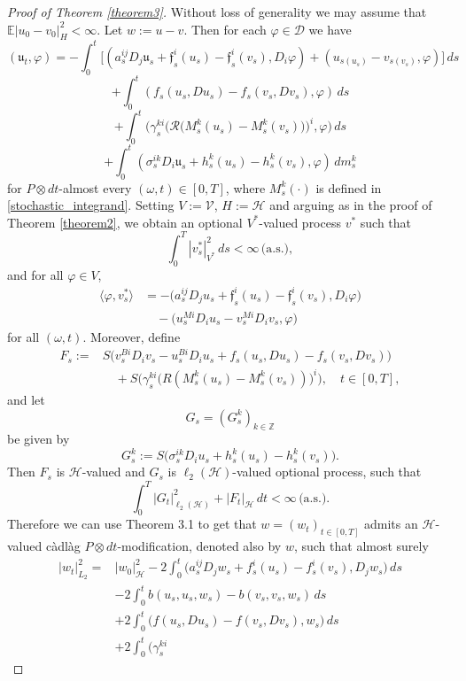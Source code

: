 \documentclass[11pt,reqno]{amsart}
\theoremstyle{definition}
\theoremstyle{remark}
\newcommand\bZ{\mathbb{Z}}
\newcommand\frf{\mathfrak{f}}
\newcommand\fru{\mathfrak{u}}
\newcommand\cD{\mathcal{D}}
\newcommand\cH{\mathcal{H}}
\newcommand\cR{\mathcal{R}}
\newcommand\cV{\mathcal{V}}
\newcommand{\<}{\langle}
\renewcommand{\>}{\rangle}
\newcommand{\E}{\mathbb{E}}
\begin{document}
\medskip
\begin{proof}[Proof of Theorem \ref{theorem3}]
Without loss of generality we may assume that 
$\E|u_0-v_0|_{H}^2<\infty$. Let $w:=u-v$. 
Then for each $\varphi\in \cD$ we have 
$$
(\fru_t,\varphi)
=-\int_0^t\big[(a^{ij}_sD_j\fru_s+\frf_s^{i}(u_s)-\frf^{i}_s(v_s),D_i\varphi)
+(u_{s(u_s)}-v_{s(v_s)}, \varphi)\big]\,ds
$$
$$
+\int_0^t
(f_s(u_s,Du_s)-f_s(v_s,Dv_s),\varphi)\,ds
$$
$$
+\int_0^t
\Big(\gamma_s^{ki}\big(\cR\big(M^k_s(u_s)-M^k_s(v_s)\big)\big)^i,\varphi\Big)
\,ds
$$
$$
+\int_0^t(\sigma_s^{ik}D_i\fru_s+h_s^k(u_s)-h_s^k(v_s),\varphi)\,dm^k_s
$$
for $P\otimes dt$-almost every $(\omega,t)\in [0,T]$, 
where $M_s^k(\cdot)$ is defined in \eqref{stochastic_integrand}. 
Setting $V:=\cV$, $H:=\cH$ and arguing 
as in the proof of Theorem \ref{theorem2}, 
we obtain an optional 
$V^*$-valued process $v^*$ such that
$$
\int_0^T |v_s^*|_{V^*}^2\,ds<\infty\,\text{(a.s.)}, 
$$
and for all $\varphi\in V$,
$$
\begin{aligned}
\langle \varphi,v_s^*\rangle
&=
-
\big(
a_s^{ij}D_j u_s
+
\frf_s^i(u_s)-\frf_s^i(v_s),
D_i\varphi
\big)
\\
&\quad
-
\big(
u_s^{Mi}D_i u_s-v_s^{Mi}D_i v_s,
\varphi
\big)
\end{aligned}
$$
for all $(\omega,t)$.
Moreover, define
$$
\begin{aligned}
F_s:={}&S\Big(v_s^{Bi}D_i v_s-u_s^{Bi}D_i u_s
+f_s(u_s,Du_s)-f_s(v_s,Dv_s)\Big)\\
&\quad
+
S\Big(\gamma_s^{ki}\big(R(M_s^k(u_s)-M_s^k(v_s))\big)^i\Big),
\quad t\in[0,T],
\end{aligned}
$$
and let 
$$
G_s=(G_s^k)_{k\in\bZ}
$$
be given by
$$
G_s^k
:=
S\big(
\sigma_s^{ik}D_i u_s
+
h_s^k(u_s)-h_s^k(v_s)
\big).
$$
Then $F_s$ is $\mathcal H$-valued and $G_s$ is
$\ell_2(\mathcal H)$-valued optional process, such that 
$$
\int_0^T|G_t|_{\ell_2(\mathcal H)}^2
+
|F_t|_{\mathcal H}\,dt<\infty\,\text{(a.s.).}
$$
Therefore we can use Theorem 3.1 to get that $w=(w_t)_{t\in[0,T]}$
admits an $\mathcal H$-valued c\`adl\`ag $P\otimes dt$-modification,
denoted also by $w$, such that almost surely
\begin{align}
|w_t|_{L_2}^2=&|w_0|^2_{\cH}-2\int_0^t
\big(a_s^{ij}D_j w_s+f_s^i(u_s)-f_s^i(v_s),D_j w_s\big)\,ds  \nonumber\\
&
-2\int_0^tb(u_s,u_s,w_s)-b(v_s,v_s,w_s)\,ds                         \nonumber\\
&+
2\int_0^t\big(f(u_s,Du_s)-f(v_s,Dv_s),w_s\big)\,ds                  \nonumber\\
&+2\int_0^t\Big(\gamma_s^{ki}

\end{align}
\end{proof}
\end{document}
